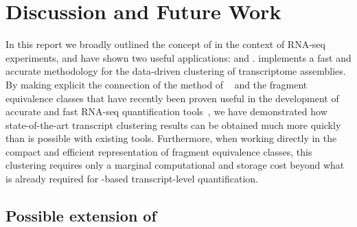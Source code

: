 \chapter{Discussion and Future Work}
\label{sec:conclusion}

In this report we broadly outlined the concept of \eq in the context of RNA-seq experiments, and have shown two useful applications: \rapclust and \quark. 
\rapclust implements a fast and accurate methodology for the data-driven clustering of \denovo transcriptome assemblies. By making explicit the connection of the method of \corset~\citep{corset} and the fragment equivalence classes that have recently been proven useful in the development of accurate and fast RNA-seq quantification tools~\cite{sailfish, salmon, kallisto}, we have demonstrated how state-of-the-art transcript clustering results can be obtained much more quickly than is possible with existing tools. Furthermore, when working directly in the compact and efficient representation of fragment equivalence classes, this clustering requires only a marginal computational and storage cost beyond what is already required for \qm-based transcript-level quantification. 




\section{Possible extension of \rapclust}

